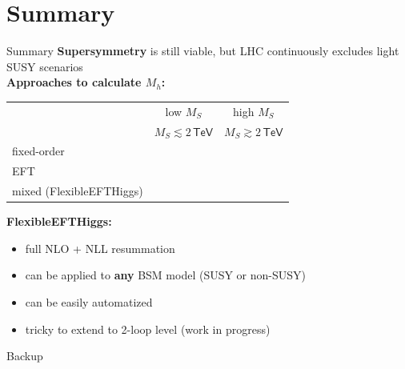 \documentclass[hyperref={pdfpagelabels=false},ngerman]{beamer}
\newcommand{\cmark}{\ding{51}}%
\newcommand{\xmark}{\ding{55}}%
\newcommand{\eh}[1]{\,\mathsf{#1}}
\newcommand{\ok}{\textcolor{darkgreen}{\cmark}}
\newcommand{\notok}{\textcolor{red}{\xmark}}
\newcommand{\MS}{\ensuremath{M_S}}
\renewcommand{\emph}{\textbf}
\begin{document}

\section{Summary}

\begin{frame}{Summary}
  \emph{Supersymmetry} is still viable, but LHC continuously excludes
  light SUSY scenarios\\[1em]
  \emph{Approaches to calculate $M_h$:}
  \begin{center}
    \begin{tabular}{lcc}
      \toprule
                               & low $\MS$ & high $\MS$ \\
                               & $\MS \lesssim 2\eh{TeV}$ & $\MS \gtrsim 2\eh{TeV}$ \\
      \midrule
      fixed-order              & \ok       & \notok     \\
      EFT                      & \notok    & \ok        \\
      mixed (FlexibleEFTHiggs) & \ok       & \ok        \\
      \bottomrule
    \end{tabular}
  \end{center}
  \emph{FlexibleEFTHiggs:}
  \begin{itemize}
  \item full NLO + NLL resummation
  \item can be applied to \emph{any} BSM model (SUSY or non-SUSY)
  \item can be easily automatized
  \item tricky to extend to 2-loop level (work in progress)
  \end{itemize}
\end{frame}


\begin{frame}[noframenumbering]
  \begin{center}
    \Huge Backup
  \end{center}
\end{frame}

\end{document}
